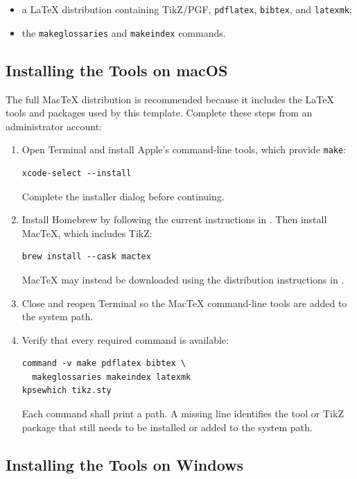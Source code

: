 \begin{itemize}
  \item a LaTeX distribution containing TikZ/PGF, \texttt{pdflatex},
  \texttt{bibtex}, and \texttt{latexmk};
  \item the \texttt{makeglossaries} and \texttt{makeindex} commands.
\end{itemize}

\subsection{Installing the Tools on macOS}

The full MacTeX distribution is recommended because it includes the LaTeX tools and packages used by this template. Complete these steps from an administrator account:

\begin{enumerate}
  \item Open Terminal and install Apple's command-line tools, which provide \texttt{make}:
\begin{verbatim}
xcode-select --install
\end{verbatim}
  Complete the installer dialog before continuing.

  \item Install Homebrew by following the current instructions in \cite{HomebrewInstallation}. Then install MacTeX, which includes TikZ:
\begin{verbatim}
brew install --cask mactex
\end{verbatim}
  MacTeX may instead be downloaded using the distribution instructions in \cite{MacTeXDistribution}.

  \item Close and reopen Terminal so the MacTeX command-line tools are added to the system path.

  \item Verify that every required command is available:
\begin{verbatim}
command -v make pdflatex bibtex \
  makeglossaries makeindex latexmk
kpsewhich tikz.sty
\end{verbatim}
  Each command shall print a path. A missing line identifies the tool or TikZ
  package that still needs to be installed or added to the system path.
\end{enumerate}

\subsection{Installing the Tools on Windows}

